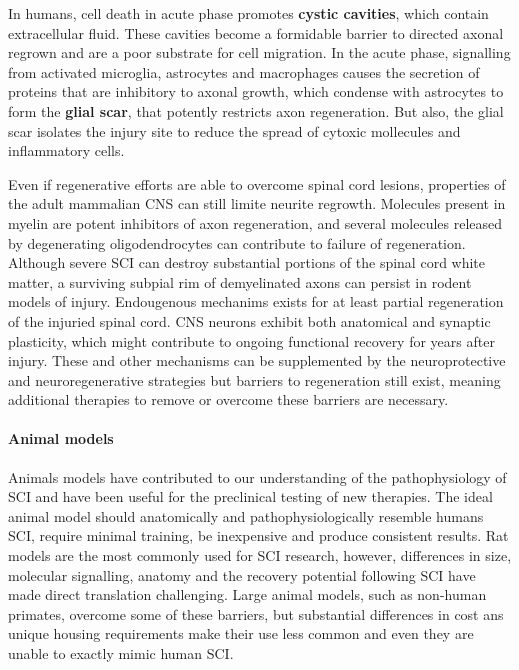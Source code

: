 \documentclass[12pt,article,oneside,a4paper]{memoir}
\begin{document}
In humans, cell death in acute phase promotes \textbf{cystic cavities}, which
contain extracellular fluid. These cavities become a formidable barrier to
directed axonal regrown and are a poor substrate for cell migration. In the
acute phase, signalling from activated microglia, astrocytes and macrophages
causes the secretion of proteins that are inhibitory to axonal growth, which
condense with astrocytes to form the \textbf{glial scar}, that potently
restricts axon regeneration. But also, the glial scar isolates the injury site
to reduce the spread of cytoxic mollecules and inflammatory cells.

Even if regenerative efforts are able to overcome spinal cord lesions,
properties of the adult mammalian CNS can still limite neurite regrowth.
Molecules present in myelin are potent inhibitors of axon regeneration, and
several molecules released by degenerating oligodendrocytes can contribute to
failure of regeneration. 
Although severe SCI can destroy substantial portions of the spinal cord white
matter, a surviving subpial rim of demyelinated axons can persist in rodent
models of injury. Endougenous mechanims exists for at least partial regeneration
of the injuried spinal cord. CNS neurons exhibit both anatomical and synaptic
plasticity, which might contribute to ongoing functional recovery for years
after injury. These and other mechanisms can be supplemented by the
neuroprotective and neuroregenerative strategies but barriers to regeneration
still exist, meaning additional therapies to remove or overcome these barriers
are necessary.

\paragraph{Animal models}
Animals models have contributed to our understanding of the pathophysiology of
SCI and have been useful for the preclinical testing of new therapies. The ideal
animal model should anatomically and pathophysiologically resemble humans SCI,
require minimal training, be inexpensive and produce consistent results. Rat
models are the most commonly used for SCI research, however, differences in size,
molecular signalling, anatomy and the recovery potential following SCI have made
direct translation challenging. Large animal models, such as non-human primates,
overcome some of these barriers, but substantial differences in cost ans unique
housing requirements make their use less common and even they are unable to
exactly mimic human SCI.
\end{document}
